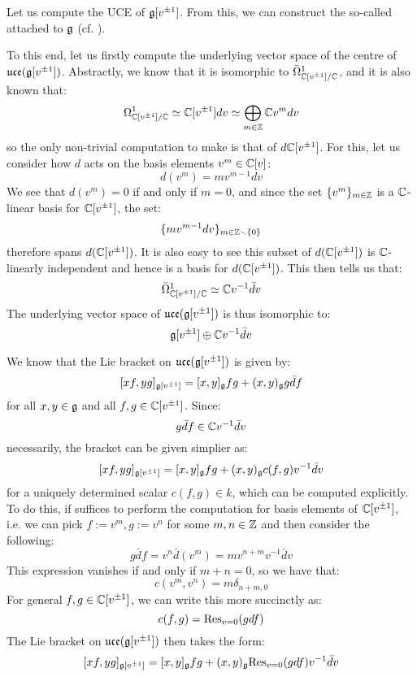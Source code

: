         \begin{example} \label{example: affine_lie_algebras_centres}
            Let us compute the UCE of $\mathfrak{g}[v^{\pm 1}]$. From this, we can construct the so-called  attached to $\mathfrak{g}$ (cf. \cite[Chapter 7]{kac_infinite_dimensional_lie_algebras}). 

            To this end, let us firstly compute the underlying vector space of the centre of $\mathfrak{uce}(\mathfrak{g}[v^{\pm 1}])$. Abstractly, we know that it is isomorphic to $\bar{\Omega}^1_{\mathbb{C}[v^{\pm 1}]/\mathbb{C}}$, and it is also known that:
                $$\Omega^1_{\mathbb{C}[v^{\pm 1}]/\mathbb{C}} \simeq \mathbb{C}[v^{\pm 1}] dv \simeq \bigoplus_{m \in \mathbb{Z}} \mathbb{C}  v^m dv$$
            so the only non-trivial computation to make is that of $d \mathbb{C}[v^{\pm 1}]$. For this, let us consider how $d$ acts on the basis elements $v^m \in \mathbb{C}[v]$:
                $$d(v^m) = m v^{m - 1} dv$$
            We see that $d(v^m) = 0$ if and only if $m = 0$, and since the set $\{v^m\}_{m \in \mathbb{Z}}$ is a $\mathbb{C}$-linear basis for $\mathbb{C}[v^{\pm 1}]$, the set:
                $$\{m v^{m - 1} dv\}_{m \in \mathbb{Z} \smallsetminus \{0\}}$$
            therefore spans $d(\mathbb{C}[v^{\pm 1}])$. It is also easy to see this subset of $d(\mathbb{C}[v^{\pm 1}])$ is $\mathbb{C}$-linearly independent and hence is a basis for $d(\mathbb{C}[v^{\pm 1}])$. This then tells us that:
                $$\bar{\Omega}^1_{\mathbb{C}[v^{\pm 1}]/\mathbb{C}} \simeq \mathbb{C}  v^{-1} \bar{d}v$$
            The underlying vector space of $\mathfrak{uce}(\mathfrak{g}[v^{\pm 1}])$ is thus isomorphic to:
                $$\mathfrak{g}[v^{\pm 1}] \oplus \mathbb{C}  v^{-1} \bar{d}v$$

            We know that the Lie bracket on $\mathfrak{uce}(\mathfrak{g}[v^{\pm 1}])$ is given by:
                $$[x f, y g]_{\mathfrak{g}[v^{\pm 1}]} = [x, y]_{\mathfrak{g}} fg + (x, y)_{\mathfrak{g}} g \bar{d}f$$
            for all $x, y \in \mathfrak{g}$ and all $f, g \in \mathbb{C}[v^{\pm 1}]$. Since:
                $$g \bar{d}f \in \mathbb{C}  v^{-1} \bar{d}v$$
            necessarily, the bracket can be given simplier as:
                $$[x f, y g]_{\mathfrak{g}[v^{\pm 1}]} = [x, y]_{\mathfrak{g}} fg + (x, y)_{\mathfrak{g}} c(f, g) v^{-1} \bar{d}v$$
            for a uniquely determined scalar $c(f, g) \in k$, which can be computed explicitly. To do this, if suffices to perform the computation for basis elements of $\mathbb{C}[v^{\pm 1}]$, i.e. we can pick $f := v^m, g := v^n$ for some $m, n \in \mathbb{Z}$ and then consider the following:
                $$g \bar{d}f = v^n \bar{d}(v^m) = m v^{n + m} v^{-1} \bar{d}v$$
            This expression vanishes if and only if $m + n = 0$, so we have that:
                $$c(v^m, v^n) = m \delta_{n + m, 0}$$
            For general $f, g \in \mathbb{C}[v^{\pm 1}]$, we can write this more succinctly as:
                $$c(f, g) = \mathrm{Res}_{v = 0}( gdf )$$
            The Lie bracket on $\mathfrak{uce}(\mathfrak{g}[v^{\pm 1}])$ then takes the form:
                $$[x f, y g]_{\mathfrak{g}[v^{\pm 1}]} = [x, y]_{\mathfrak{g}} fg + (x, y)_{\mathfrak{g}} \mathrm{Res}_{v = 0}(g df) v^{-1} \bar{d}v$$
                

\end{example}
